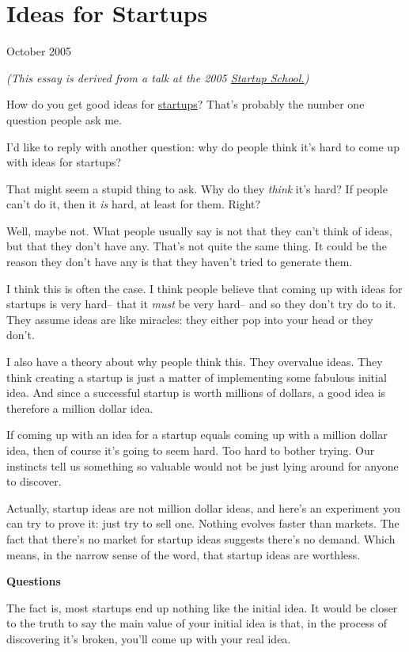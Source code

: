 \chapter{Ideas for Startups}

October 2005

\emph{(This essay is derived from a talk at the 2005
\href{http://startupschool.org}{Startup School.})}

How do you get good ideas for \href{start.html}{startups}? That's
probably the number one question people ask me.

I'd like to reply with another question: why do people think it's hard
to come up with ideas for startups?

That might seem a stupid thing to ask. Why do they \emph{think} it's
hard? If people can't do it, then it \emph{is} hard, at least for them.
Right?

Well, maybe not. What people usually say is not that they can't think of
ideas, but that they don't have any. That's not quite the same thing. It
could be the reason they don't have any is that they haven't tried to
generate them.

I think this is often the case. I think people believe that coming up
with ideas for startups is very hard-- that it \emph{must} be very
hard-- and so they don't try do to it. They assume ideas are like
miracles: they either pop into your head or they don't.

I also have a theory about why people think this. They overvalue ideas.
They think creating a startup is just a matter of implementing some
fabulous initial idea. And since a successful startup is worth millions
of dollars, a good idea is therefore a million dollar idea.

If coming up with an idea for a startup equals coming up with a million
dollar idea, then of course it's going to seem hard. Too hard to bother
trying. Our instincts tell us something so valuable would not be just
lying around for anyone to discover.

Actually, startup ideas are not million dollar ideas, and here's an
experiment you can try to prove it: just try to sell one. Nothing
evolves faster than markets. The fact that there's no market for startup
ideas suggests there's no demand. Which means, in the narrow sense of
the word, that startup ideas are worthless.

\textbf{Questions}

The fact is, most startups end up nothing like the initial idea. It
would be closer to the truth to say the main value of your initial idea
is that, in the process of discovering it's broken, you'll come up with
your real idea.

